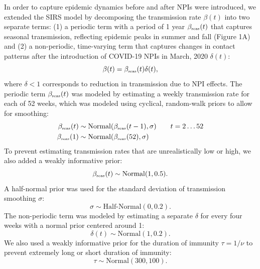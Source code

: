 \documentclass[12pt]{article}
\newcommand{\tsub}[2]{#1_{{\textrm{\tiny #2}}}}
\begin{document}
In order to capture epidemic dynamics before and after NPIs were introduced, we extended the SIRS model by decomposing the transmission rate $\beta(t)$ into two separate terms: (1) a periodic term with a period of 1 year $\tsub{\beta}{seas}(t)$ that captures seasonal transmission, reflecting epidemic peaks in summer and fall (Figure 1A) and (2) a non-periodic, time-varying term that captures changes in contact patterns after the introduction of COVID-19 NPIs in March, 2020 $\delta(t)$:
\begin{equation}
\beta(t) = \tsub{\beta}{seas}(t) \delta(t),
\end{equation}
where $\delta < 1$ corresponds to reduction in transmission due to NPI effects.
The periodic term $\tsub{\beta}{seas}(t)$ was modeled by estimating a weekly transmission rate for each of 52 weeks, which was modeled using cyclical, random-walk priors to allow for smoothing:
\begin{align}
\tsub{\beta}{seas}(t) &\sim \mathrm{Normal}(\tsub{\beta}{seas}(t-1), \sigma) \qquad t = 2 \dots 52\\
\tsub{\beta}{seas}(1) &\sim \mathrm{Normal}(\tsub{\beta}{seas}(52), \sigma)
\end{align}
To prevent estimating transmission rates that are unrealistically low or high, we also added a weakly informative prior:
\begin{equation}
\tsub{\beta}{seas}(t) \sim \mathrm{Normal}(1, 0.5).
\end{equation}
A half-normal prior was used for the standard deviation of transmission smoothing $\sigma$:
\begin{equation}
\sigma \sim \textrm{Half-Normal}(0, 0.2).
\end{equation}
The non-periodic term was modeled by estimating a separate $\delta$ for every four weeks with a normal prior centered around 1:
\begin{equation}
\delta(t) \sim \mathrm{Normal}(1, 0.2).
\end{equation}
We also used a weakly informative prior for the duration of immunity $\tau = 1/\nu$ to prevent extremely long or short duration of immunity:
\begin{equation}
\tau \sim \mathrm{Normal}(300, 100).
\end{equation}
\end{document}
